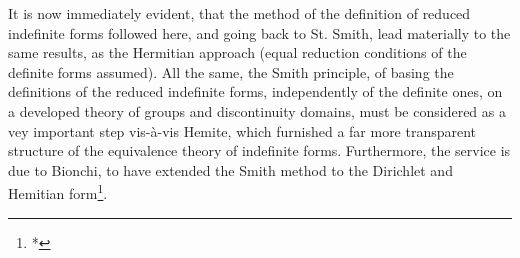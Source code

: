 It is now immediately evident, that the method of the definition of reduced indefinite forms followed here, and going back to St. Smith, lead materially to the same results, as the Hermitian approach (equal reduction conditions of the definite forms assumed). All the same, the Smith principle, of basing the definitions of the reduced indefinite forms, independently of the definite ones, on a developed theory of groups and discontinuity domains, must be considered as a vey important step vis-à-vis Hemite, which furnished a far more transparent structure of the equivalence theory of indefinite forms. Furthermore, the service is due to Bionchi, to have extended the Smith method to the Dirichlet and Hemitian form\footnote{*}.
